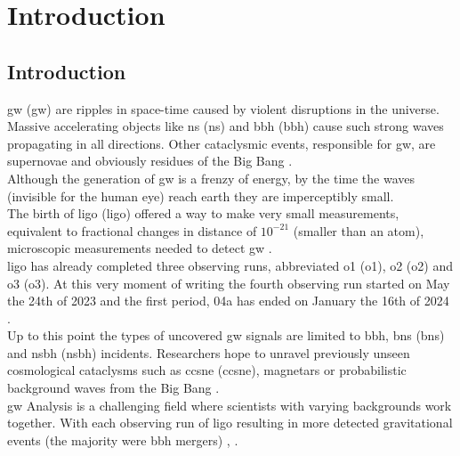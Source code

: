 \chapter{Introduction}
\section{Introduction}
\label{sec-Introduction}
\acrlong{gw} (\acrshort{gw}) are ripples in space-time caused by violent disruptions in the universe. Massive accelerating objects like \acrlong{ns} (\acrshort{ns}) and \acrlong{bbh} (\acrshort{bbh}) cause such strong waves propagating in all directions. Other cataclysmic events, responsible for \acrshort{gw}, are supernovae and obviously residues of the Big Bang \citep{CaltechWhatAreGW}. \\
Although the generation of \acrshort{gw} is a frenzy of energy, by the time the waves (invisible for the human eye) reach earth they are imperceptibly small.\\
The birth of \acrshort{ligo} (\acrlong{ligo}) offered a way to make very small measurements, equivalent to fractional changes in distance of $10^{-21}$ (smaller than an atom), microscopic measurements needed to detect \acrshort{gw} \citep{zevin2017gravity,glanzer2023data}. \\
\acrshort{ligo} has already completed three observing runs, abbreviated \acrshort{o1} (\acrlong{o1}), \acrshort{o2} (\acrlong{o2}) and \acrshort{o3} (\acrlong{o3}). At this very moment of writing the fourth observing run started on May the 24th of 2023 and the first period, 04a has ended on January the 16th of 2024 \citep{LIGORunPlan}. \\
Up to this point the types of uncovered \acrshort{gw} signals are limited to \acrshort{bbh}, \acrlong{bns} (\acrshort{bns}) and \acrlong{nsbh} (\acrshort{nsbh}) incidents. Researchers hope to unravel previously unseen cosmological cataclysms such as \acrshort{ccsne} (\acrlong{ccsne}), magnetars or probabilistic background waves from the Big Bang \citep{cuoco2020enhancing}. \\
\acrshort{gw} Analysis is a challenging field where scientists with varying backgrounds work together. With each observing run of \acrshort{ligo} resulting in more detected gravitational events (the majority were \acrshort{bbh} mergers) \citep{zevin2017gravity,glanzer2023data}, \citep{CaltechFAQ}. 

